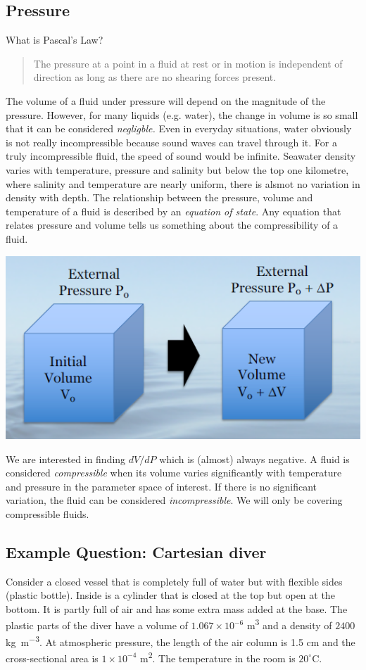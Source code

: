 \documentclass[class=report, crop=false, 12pt,a4paper]{standalone}
\begin{document}
\subsection{Pressure}
What is Pascal's Law?
\begin{quote}
  \begin{center}
    The pressure at a point in a fluid at rest or in motion is independent of direction as long as there are no shearing forces present.
  \end{center}
\end{quote}
The volume of a fluid under pressure will depend on the magnitude of the pressure. However, for many liquids (e.g. water), the change in volume is so small that it can be considered \emph{negligble.} Even in everyday situations, water obviously is not really incompressible because sound waves can travel through it. For a truly incompressible fluid, the speed of sound would be infinite. Seawater density varies with temperature, pressure and salinity but below the top one kilometre, where salinity and temperature are nearly uniform, there is alsmot no variation in density with depth. The relationship between the pressure, volume and temperature of a fluid is described by an \emph{equation of state}. Any equation that relates pressure and volume tells us something about the compressibility of a fluid. 
\begin{center}
  \includegraphics[width = 0.8 \textwidth]{../img/CompressibilityOfFluid}
\end{center}
We are interested in finding \( dV/dP\) which is (almost) always negative. A fluid is considered \emph{compressible} when its volume varies significantly with temperature and pressure in the parameter space of interest. If there is no significant variation, the fluid can be considered \emph{incompressible}. We will only be covering compressible fluids.

\subsection{Example Question: Cartesian diver}
Consider a closed vessel that is completely full of water but with flexible sides (plastic bottle). Inside is a cylinder that is closed at the top but open at the bottom. It is partly full of air and has some extra mass added at the base. The plastic parts of the diver have a volume of \(1.067\times 10^{-6} \) \si{\meter\cubed} and a density of \(2400\) \si{\kg\per\meter\cubed}. At atmospheric pressure, the length of the air column is 1.5 \si{\cm} and the cross-sectional area is \(1\times 10^{-4}\) \si{\meter\squared}. The temperature in the room is \(20^{\circ}\)C. 
\end{document}
